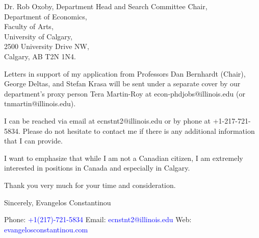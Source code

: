 \documentclass[12pt]{letter}
\begin{document}
\begin{letter}{Dr. Rob Oxoby, Department Head and Search Committee Chair, \\
Department of Economics,\\
Faculty of Arts,\\
University of Calgary,\\
2500 University Drive NW,\\
Calgary, AB T2N 1N4.}


Letters in support of my application from Professors Dan Bernhardt (Chair), George Deltas, and Stefan Krasa will be sent under a separate cover by our department's proxy person Tera Martin-Roy at econ-phdjobs@illinois.edu (or tnmartin@illinois.edu).






I can be reached via email at ecnstnt2@illinois.edu or by phone at +1-217-721-5834. Please do not hesitate to contact me if there is any additional information that I can provide.

I want to emphasize that while I am not a Canadian citizen, I am extremely interested in positions in Canada and especially in Calgary.

Thank you very much for your time and consideration.


\noindent Sincerely,
\newline\noindent Evangelos Constantinou
\begin{paracol}{3}
\noindent Phone: \textcolor{blue}{+1(217)-721-5834}
\switchcolumn
\noindent Email: \textcolor{blue}{ecnstnt2@illinois.edu}
\switchcolumn
\noindent Web: \textcolor{blue}{evangelosconstantinou.com}
\end{paracol}
\end{letter}
\end{document}
